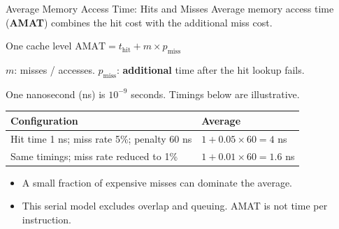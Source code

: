 \documentclass[aspectratio=169,11pt,t]{beamer}
\newcommand{\key}[1]{\textbf{#1}}
\begin{document}
\begin{frame}{Average Memory Access Time: Hits and Misses}
\small
Average memory access time (\key{AMAT}) combines the hit cost with the additional miss cost.
\begin{block}{One cache level}
\centering \(\mathrm{AMAT}=t_{\mathrm{hit}}+m\times p_{\mathrm{miss}}\)
\end{block}
\(m\): misses / accesses. \quad \(p_{\mathrm{miss}}\): \key{additional} time after the hit lookup fails.
\par\vspace{.14cm}
One nanosecond (ns) is \(10^{-9}\) seconds. Timings below are illustrative.
\vspace{.17cm}
\renewcommand{\arraystretch}{1.35}
\begin{tabular}{R{7.5cm}R{5.6cm}}
\toprule
\textbf{Configuration} & \textbf{Average}\\
\midrule
Hit time 1 ns; miss rate 5\%; penalty 60 ns & \(1+0.05\times60=4\) ns\\
Same timings; miss rate reduced to 1\% & \(1+0.01\times60=1.6\) ns\\
\bottomrule
\end{tabular}\par
\vspace{.2cm}
\begin{itemize}\setlength{\itemsep}{5pt}
  \item A small fraction of expensive misses can dominate the average.
  \item This serial model excludes overlap and queuing. AMAT is not time per instruction.
\end{itemize}
\end{frame}
\end{document}
